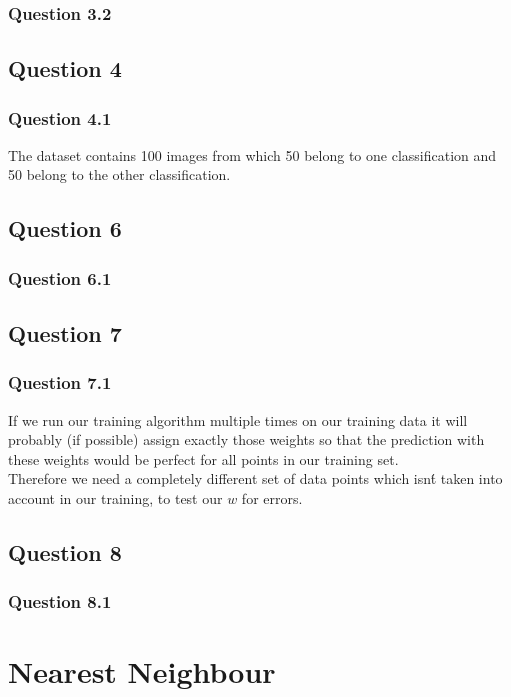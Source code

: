 \documentclass[11pt,twoside,a4paper]{article}
\begin{document}
	
	\subsection{Question 3.2}
	
\section{Question 4}

	\subsection{Question 4.1}
	The dataset contains 100 images from which 50 belong to one classification and 50 belong to the other classification.
	
\section{Question 6}

	\subsection{Question 6.1}
	
\section{Question 7}

	\subsection{Question 7.1}
	If we run our training algorithm multiple times on our training data it will probably (if possible) assign exactly those weights so that the prediction with these weights would be perfect for all points in our training set. \\
	Therefore we need a completely different set of data points which isn\'t taken into account in our training, to test our $w$ for errors.
	
\section{Question 8}

	\subsection{Question 8.1}
	

\chapter{Nearest Neighbour}
\end{document}
